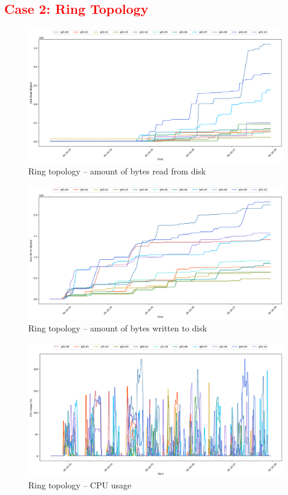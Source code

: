 \subsection{\textcolor{red}{Case 2: Ring Topology}}

\begin{figure}[H]
\includegraphics[width=\linewidth]{figures/ring/blk_read.png}
\caption{Ring topology -- amount of bytes read from disk}
\end{figure}
\begin{figure}[H]
\includegraphics[width=\linewidth]{figures/ring/blk_write.png}
\caption{Ring topology -- amount of bytes written to disk}
\end{figure}
\begin{figure}[H]
\includegraphics[width=\linewidth]{figures/ring/cpu_usage.png}
\caption{Ring topology -- CPU usage}
\end{figure}

